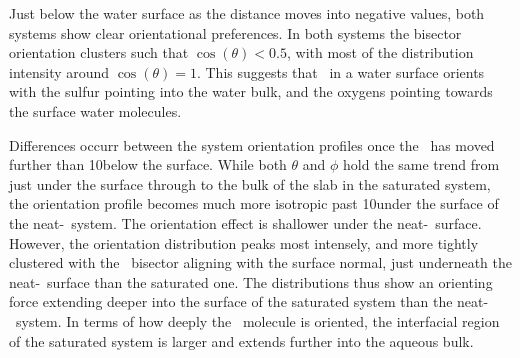 	Just below the water surface as the distance moves into negative values, both systems show clear orientational preferences. In both systems the bisector orientation clusters such that $\cos(\theta)<0.5$, with most of the distribution intensity around $\cos(\theta)=1$. This suggests that \suldiox~in a water surface orients with the sulfur pointing into the water bulk, and the oxygens pointing towards the surface water molecules.

	Differences occurr between the system orientation profiles once the \suldiox~has moved further than 10\angs below the surface. While both $\theta$ and $\phi$ hold the same trend from just under the surface through to the bulk of the slab in the saturated system, the orientation profile becomes much more isotropic past 10\angs under the surface of the neat-\wat~system. The orientation effect is shallower under the neat-\wat~surface. However, the orientation distribution peaks most intensely, and more tightly clustered with the \suldiox~bisector aligning with the surface normal, just underneath the neat-\wat~surface than the saturated one. The distributions thus show an orienting force extending deeper into the surface of the saturated system than the neat-\wat~system. In terms of how deeply the \suldiox~molecule is oriented, the interfacial region of the saturated system is larger and extends further into the aqueous bulk.
